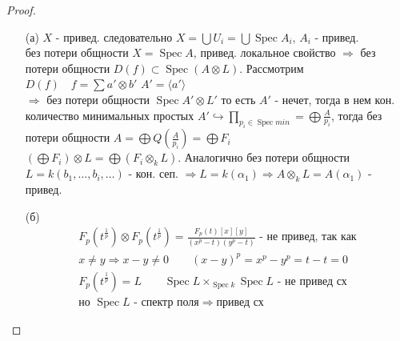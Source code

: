 \begin{proof}
\begin{itemize}
\item[]
\item[(а)] $X$ - привед. следовательно $X = \bigcup U_i = \bigcup \operatorname{Spec} A_i$, $A_i$ - привед.\\
    без потери общности $X = \operatorname{Spec} A$, привед. локальное свойство $\Rightarrow$ без потери общности $D(f) \subset \operatorname{Spec}(A \otimes L)$. Рассмотрим $D(f)\quad f = \sum a'\otimes b'$ $A'= \langle a'\rangle$\\ $\Rightarrow$ без потери общности $\operatorname{Spec} A'\otimes L'$ то есть $A'$ - нечет, тогда в нем кон. количество минимальных простых $A' \hookrightarrow \prod\limits_{p_i \in \operatorname{Spec} min} = \bigoplus \frac{A}{p_i}$, тогда без потери общности $A = \bigoplus Q(\frac{A}{p_i}) = \bigoplus F_i$\\
    $(\bigoplus F_i) \otimes L = \bigoplus (F_i \otimes_k L)$. Аналогично без потери общности $L = k(b_1, \ldots, b_i, \ldots)$ - кон. сеп. $\Rightarrow L = k(\alpha_1) \Rightarrow A \otimes_k L = A(\alpha_1)$ - привед. 
\item[(б)] 
    \begin{gather*}
        F_p(t^{\frac{1}{p}}) \otimes F_p(t^{\frac{1}{p}}) = \frac{F_p(t)[x][y]}{(x^p-t)(y^p-t)} \text{ - не привед, так как}\\
        x \neq y \Rightarrow x-y \ne 0\qquad (x-y)^p = x^p - y^p = t - t = 0\\
        F_p(t^{\frac{1}{p}}) = L\qquad \operatorname{Spec} L \times_{\operatorname{Spec} k} \operatorname{Spec} L \text{ - не привед сх}\\
        \text{но } \operatorname{Spec} L \text{ - спектр поля} \Rightarrow \text{привед сх}  
    \end{gather*}
\end{itemize}
\end{proof}
\begin{comment}

\end{comment}
\vskip 0.6in





